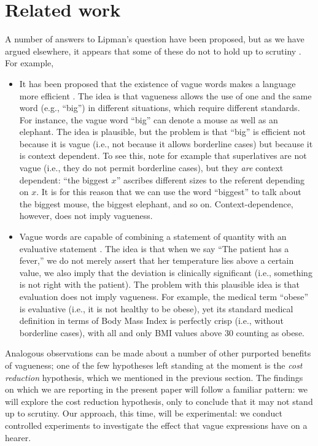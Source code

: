 \documentclass[ %
  graybox       %
 ,envcountchap  %
 ,sectrefs      %
]{svmono}
\begin{document}
\section{Related work}\label{related-work}
A number of answers to Lipman's question have been proposed, but as we have argued elsewhere, it appears that some of these do not to hold up to scrutiny \citep{van2009utility,vanDeemterBook}. For example,
\begin{itemize}
\item It has been proposed that the existence of vague words makes a language more efficient \citep{barwiseperry}. The idea is that vagueness allows the use of one and the same word (e.g., ``big'') in different situations, which require different standards. For instance, the vague word ``big'' can denote a mouse as well as an elephant. The idea is plausible, but the problem is that ``big'' is efficient not because it is vague (i.e., not because it allows borderline cases) but because it is context dependent. To see this, note for example that superlatives are not vague (i.e., they do not permit borderline cases), but they {\em are} context dependent: ``the biggest $x$'' ascribes different sizes to the referent depending on $x$. It is for this reason that we can use the word ``biggest''  to talk about the biggest mouse, the biggest elephant, and so on. Context-dependence, however, does not imply vagueness.
\item Vague words are capable of combining a statement of quantity with an evaluative statement \citep{veltman}. The idea is that when we say ``The patient has a fever,'' we do not merely assert that her temperature lies above a certain value, we also imply that the deviation is clinically significant (i.e., something is not right with the patient). The problem with this plausible idea is that evaluation does not imply vagueness. For example, the medical term ``obese'' is evaluative (i.e., it is not healthy to be obese), yet its standard medical definition in terms of Body Mass Index is perfectly crisp (i.e., without borderline cases), with all and only BMI values above 30 counting as obese.
\end{itemize}
Analogous observations can be made about a number of other purported benefits of vagueness; one of the few hypotheses left standing at the moment is the {\em cost reduction} hypothesis, which we mentioned in the previous section. The findings on which we are reporting in the present paper will follow a familiar pattern: we will explore the cost reduction hypothesis, only to conclude that it may not stand up to scrutiny. Our approach, this time, will be experimental: we conduct controlled experiments to investigate the effect that vague expressions have on a hearer.
\end{document}
